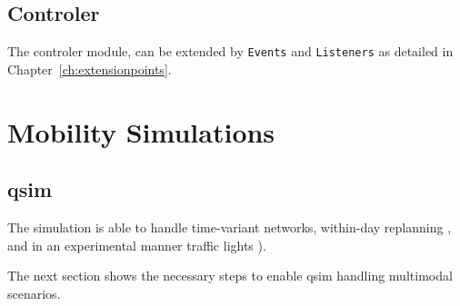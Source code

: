 \subsection{Controler}
\label{sec:extending-controler}
The controler module, can be extended by \lstinline|Events| and \lstinline|Listeners| as detailed in Chapter~\ref{ch:extensionpoints}. 
%


\section{Mobility Simulations}
\label{sec:extending-mobsims}
\subsection{\protect\gls{qsim}}
\label{sec:extending-qsim}
The simulation is able to handle time-variant networks, within-day replanning \citep[][]{Dobler_TechRep_IVT_2009}, and in an experimental manner traffic lights \citep[][]{Neumann_MastersThesis_2008}).

The next section shows the necessary steps to enable \gls{qsim} handling \gls{multimodal} scenarios.

